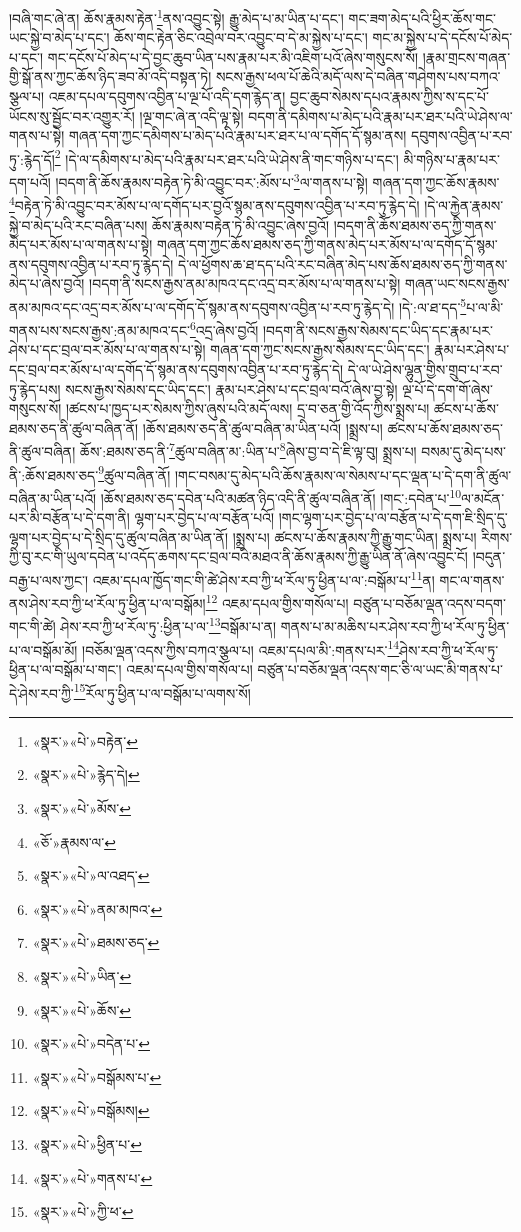 །བཞི་གང་ཞེ་ན། ཆོས་རྣམས་རྟེན་\footnote{«སྣར་»«པེ་»བརྟེན་}ནས་འབྱུང་སྟེ། རྒྱུ་མེད་པ་མ་ཡིན་པ་དང་། གང་ཟག་མེད་པའི་ཕྱིར་ཆོས་གང་ཡང་སྐྱེ་བ་མེད་པ་དང་། ཆོས་གང་རྟེན་ཅིང་འབྲེལ་བར་འབྱུང་བ་དེ་མ་སྐྱེས་པ་དང་། གང་མ་སྐྱེས་པ་དེ་དངོས་པོ་མེད་པ་དང་། གང་དངོས་པོ་མེད་པ་དེ་བྱང་ཆུབ་ཡིན་པས་རྣམ་པར་མི་འཇིག་པའོ་ཞེས་གསུངས་སོ། །རྣམ་གྲངས་གཞན་གྱི་སྒོ་ནས་ཀྱང་ཆོས་ཉིད་ཟབ་མོ་འདི་བསྟན་ཏེ། སངས་རྒྱས་ཕལ་པོ་ཆེའི་མདོ་ལས་དེ་བཞིན་གཤེགས་པས་བཀའ་སྩལ་པ། འཇམ་དཔལ་དབུགས་འབྱིན་པ་ལྔ་པོ་འདི་དག་རྙེད་ན། བྱང་ཆུབ་སེམས་དཔའ་རྣམས་ཀྱིས་ས་དང་པོ་ཡོངས་སུ་སྦྱོང་བར་འགྱུར་རོ། །ལྔ་གང་ཞེ་ན་འདི་ལྟ་སྟེ། བདག་ནི་དམིགས་པ་མེད་པའི་རྣམ་པར་ཐར་པའི་ཡེ་ཤེས་ལ་གནས་པ་སྟེ། གཞན་དག་ཀྱང་དམིགས་པ་མེད་པའི་རྣམ་པར་ཐར་པ་ལ་དགོད་དོ་སྙམ་ནས། དབུགས་འབྱིན་པ་རབ་ཏུ་:རྙེད་དོ།\footnote{«སྣར་»«པེ་»རྙེད་དེ།} །དེ་ལ་དམིགས་པ་མེད་པའི་རྣམ་པར་ཐར་པའི་ཡེ་ཤེས་ནི་གང་གཉིས་པ་དང་། མི་གཉིས་པ་རྣམ་པར་དག་པའོ། །བདག་ནི་ཆོས་རྣམས་བརྟེན་ཏེ་མི་འབྱུང་བར་:མོས་པ་\footnote{«སྣར་»«པེ་»མོས་}ལ་གནས་པ་སྟེ། གཞན་དག་ཀྱང་ཆོས་རྣམས་\footnote{«ཅོ་»རྣམས་ལ་}བརྟེན་ཏེ་མི་འབྱུང་བར་མོས་པ་ལ་དགོད་པར་བྱའོ་སྙམ་ནས་དབུགས་འབྱིན་པ་རབ་ཏུ་རྙེད་དེ། །དེ་ལ་རྐྱེན་རྣམས་སྐྱེ་བ་མེད་པའི་རང་བཞིན་པས། ཆོས་རྣམས་བརྟེན་ཏེ་མི་འབྱུང་ཞེས་བྱའོ། །བདག་ནི་ཆོས་ཐམས་ཅད་ཀྱི་གནས་མེད་པར་མོས་པ་ལ་གནས་པ་སྟེ། གཞན་དག་ཀྱང་ཆོས་ཐམས་ཅད་ཀྱི་གནས་མེད་པར་མོས་པ་ལ་དགོད་དོ་སྙམ་ནས་དབུགས་འབྱིན་པ་རབ་ཏུ་རྙེད་དེ། དེ་ལ་ཕྱོགས་ཆ་ཐ་དད་པའི་རང་བཞིན་མེད་པས་ཆོས་ཐམས་ཅད་ཀྱི་གནས་མེད་པ་ཞེས་བྱའོ། །བདག་ནི་སངས་རྒྱས་ནམ་མཁའ་དང་འདྲ་བར་མོས་པ་ལ་གནས་པ་སྟེ། གཞན་ཡང་སངས་རྒྱས་ནམ་མཁའ་དང་འདྲ་བར་མོས་པ་ལ་དགོད་དོ་སྙམ་ནས་དབུགས་འབྱིན་པ་རབ་ཏུ་རྙེད་དེ། །དེ་:ལ་ཐ་དད་\footnote{«སྣར་»«པེ་»ལ་འཐད་}པ་ལ་མི་གནས་པས་སངས་རྒྱས་:ནམ་མཁའ་དང་\footnote{«སྣར་»«པེ་»ནམ་མཁའ་}འདྲ་ཞེས་བྱའོ། །བདག་ནི་སངས་རྒྱས་སེམས་དང་ཡིད་དང་རྣམ་པར་ཤེས་པ་དང་བྲལ་བར་མོས་པ་ལ་གནས་པ་སྟེ། གཞན་དག་ཀྱང་སངས་རྒྱས་སེམས་དང་ཡིད་དང་། རྣམ་པར་ཤེས་པ་དང་བྲལ་བར་མོས་པ་ལ་དགོད་དོ་སྙམ་ནས་དབུགས་འབྱིན་པ་རབ་ཏུ་རྙེད་དེ། དེ་ལ་ཡེ་ཤེས་ལྷུན་གྱིས་གྲུབ་པ་རབ་ཏུ་རྙེད་པས། སངས་རྒྱས་སེམས་དང་ཡིད་དང་། རྣམ་པར་ཤེས་པ་དང་བྲལ་བའོ་ཞེས་བྱ་སྟེ། ལྔ་པོ་དེ་དག་གོ་ཞེས་གསུངས་སོ། །ཚངས་པ་ཁྱད་པར་སེམས་ཀྱིས་ཞུས་པའི་མདོ་ལས། དྲ་བ་ཅན་གྱི་འོད་ཀྱིས་སྨྲས་པ། ཚངས་པ་ཆོས་ཐམས་ཅད་ནི་ཚུལ་བཞིན་ནོ། །ཆོས་ཐམས་ཅད་ནི་ཚུལ་བཞིན་མ་ཡིན་པའོ། །སྨྲས་པ། ཚངས་པ་ཆོས་ཐམས་ཅད་ནི་ཚུལ་བཞིན། ཆོས་:ཐམས་ཅད་ནི་\footnote{«སྣར་»«པེ་»ཐམས་ཅད་}ཚུལ་བཞིན་མ་:ཡིན་པ་\footnote{«སྣར་»«པེ་»ཡིན་}ཞེས་བྱ་བ་དེ་ཇི་ལྟ་བུ། སྨྲས་པ། བསམ་དུ་མེད་པས་ནི་:ཆོས་ཐམས་ཅད་\footnote{«སྣར་»«པེ་»ཆོས་}ཚུལ་བཞིན་ནོ། །གང་བསམ་དུ་མེད་པའི་ཆོས་རྣམས་ལ་སེམས་པ་དང་ལྡན་པ་དེ་དག་ནི་ཚུལ་བཞིན་མ་ཡིན་པའོ། །ཆོས་ཐམས་ཅད་དབེན་པའི་མཚན་ཉིད་འདི་ནི་ཚུལ་བཞིན་ནོ། །གང་:དབེན་པ་\footnote{«སྣར་»«པེ་»བདེན་པ་}ལ་མངོན་པར་མི་བརྩོན་པ་དེ་དག་ནི། ལྷག་པར་བྱེད་པ་ལ་བརྩོན་པའོ། །གང་ལྷག་པར་བྱེད་པ་ལ་བརྩོན་པ་དེ་དག་ཇི་སྲིད་དུ་ལྷག་པར་བྱེད་པ་དེ་སྲིད་དུ་ཚུལ་བཞིན་མ་ཡིན་ནོ། །སྨྲས་པ། ཚངས་པ་ཆོས་རྣམས་ཀྱི་རྒྱུ་གང་ཡིན། སྨྲས་པ། རིགས་ཀྱི་བུ་རང་གི་ཡུལ་དབེན་པ་འདོད་ཆགས་དང་བྲལ་བའི་མཐའ་ནི་ཆོས་རྣམས་ཀྱི་རྒྱུ་ཡིན་ནོ་ཞེས་འབྱུང་ངོ། །བདུན་བརྒྱ་པ་ལས་ཀྱང་། འཇམ་དཔལ་ཁྱོད་གང་གི་ཚེ་ཤེས་རབ་ཀྱི་ཕ་རོལ་ཏུ་ཕྱིན་པ་ལ་:བསྒོམ་པ་\footnote{«སྣར་»«པེ་»བསྒོམས་པ་}ན། གང་ལ་གནས་ནས་ཤེས་རབ་ཀྱི་ཕ་རོལ་ཏུ་ཕྱིན་པ་ལ་བསྒོམ།\footnote{«སྣར་»«པེ་»བསྒོམས།} འཇམ་དཔལ་གྱིས་གསོལ་པ། བཙུན་པ་བཅོམ་ལྡན་འདས་བདག་གང་གི་ཚེ། ཤེས་རབ་ཀྱི་ཕ་རོལ་ཏུ་:ཕྱིན་པ་ལ་\footnote{«སྣར་»«པེ་»ཕྱིན་པ་}བསྒོམ་པ་ན། གནས་པ་མ་མཆིས་པར་ཤེས་རབ་ཀྱི་ཕ་རོལ་ཏུ་ཕྱིན་པ་ལ་བསྒོམ་མོ། །བཅོམ་ལྡན་འདས་ཀྱིས་བཀའ་སྩལ་པ། འཇམ་དཔལ་མི་:གནས་པར་\footnote{«སྣར་»«པེ་»གནས་པ་}ཤེས་རབ་ཀྱི་ཕ་རོལ་ཏུ་ཕྱིན་པ་ལ་བསྒོམ་པ་གང་། འཇམ་དཔལ་གྱིས་གསོལ་པ། བཙུན་པ་བཅོམ་ལྡན་འདས་གང་ཅི་ལ་ཡང་མི་གནས་པ་དེ་ཤེས་རབ་ཀྱི་\footnote{«སྣར་»«པེ་»ཀྱི་ཕ་}རོལ་ཏུ་ཕྱིན་པ་ལ་བསྒོམ་པ་ལགས་སོ། 